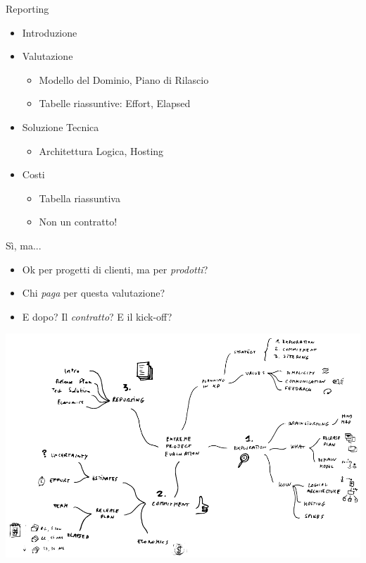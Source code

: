 \documentclass[compress, red, 14pt, pdf]{beamer}
\newcommand{\highlight}[1]{{\color{purple} \emph{#1}}}
\begin{document}
	\begin{frame}{Reporting}
		\begin{itemize}
			\item Introduzione
			\item Valutazione
			\begin{itemize}
				\item Modello del Dominio, Piano di Rilascio
				\item Tabelle riassuntive: Effort, Elapsed
			\end{itemize}
			\item Soluzione Tecnica
			\begin{itemize}
				\item Architettura Logica, Hosting
			\end{itemize}
			\item Costi
			\begin{itemize}
				\item Tabella riassuntiva
				\item Non un contratto!
			\end{itemize}
		\end{itemize}
	\end{frame}
	
	\begin{frame}{Sì, ma...}
		\begin{itemize}
			\item Ok per progetti di clienti, ma per \highlight{prodotti}?
			\item Chi \highlight{paga} per questa valutazione?
			\item E dopo? Il \highlight{contratto}? E il kick-off?
		\end{itemize}
		\begin{center}
			\hspace*{-0.3cm} \includegraphics[scale=0.21]{images/takeaway}
		\end{center}
	\end{frame}
	
\end{document}
